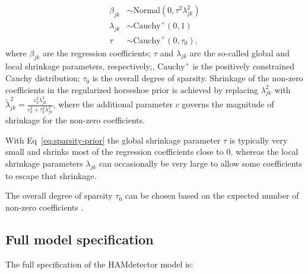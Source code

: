 \documentclass{bioinfo}
\begin{document}
\begin{methods}
\begin{equation}
  \label{eq:sparsity-prior}
  \begin{aligned}
    \beta_{jk} &\sim \text{Normal}(0, \tau^{2}\lambda^{2}_{jk}) \\
    \lambda_{jk} &\sim \text{Cauchy}^{+}(0, 1) \\
    \tau &\sim \text{Cauchy}^{+}(0, \tau_{0}),
  \end{aligned}
\end{equation}
where \(\beta_{jk}\) are the regression coefficients; \(\tau\) and \(\lambda_{jk}\) are the so-called global and local shrinkage parameters, respectively;, \(\text{Cauchy}^{+}\) is the positively constrained Cauchy distribution; $\tau_0$ is the overall degree of sparsity. Shrinkage of the non-zero coefficients in the regularized horseshoe prior is achieved by replacing \(\lambda_{jk}^2\) with \(\tilde{\lambda}^{2}_{jk} = \frac{c_{k}^{2}\lambda_{jk}^{2}}{c_{k}^{2} + \tau_{k}^{2}\lambda_{jk}^{2}}\), where the additional parameter \(c\) governs the magnitude of shrinkage for the non-zero coefficients.

With Eq~\ref{eq:sparsity-prior} the global shrinkage parameter \(\tau\) is typically very small and shrinks most of the regression coefficients close to 0, whereas the local shrinkage parameters $\lambda_{jk}$ can occasionally be very large to allow some coefficients to escape that shrinkage.

The overall degree of sparsity $\tau_0$ can be chosen based on the expected number of non-zero coefficients \citep{Piironen2016}.

\subsection{Full model specification}

The full specification of the HAMdetector model is:


\end{methods}
\end{document}
